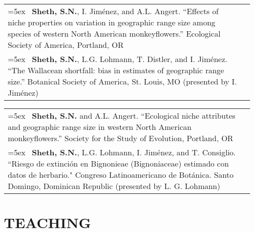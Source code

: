 \documentclass[11pt,english]{article}
\providecommand{\tabularnewline}{\\}
\begin{document}
\begin{tabularx}{\textwidth}{@{}>{\raggedright}p{5.25in} >{\raggedleft}X@{}}


\hangindent=5ex \ \textbf{Sheth, S.N.}, I. Jim\'enez, and A.L. Angert. ``Effects of niche properties on variation in geographic range size among species of western North American monkeyflowers.'' Ecological Society of America, Portland, OR & 2012 \tabularnewline

\hangindent=5ex \ \textbf{Sheth, S.N.}, L.G. Lohmann, T. Distler, and I. Jim\'enez. ``The Wallacean shortfall: bias in estimates of geographic range size.'' Botanical Society of America, St. Louis, MO (presented by I. Jim\'enez) & 2011 \tabularnewline

\end{tabularx}

\renewcommand{\arraystretch}{1.2}
\begin{tabularx}{\textwidth}{@{}>{\raggedright}p{5.25in} >{\raggedleft}X@{}}

\hangindent=5ex \ \textbf{Sheth, S.N.} and A.L. Angert. ``Ecological niche attributes and geographic range size in western North American monkeyflowers.'' Society for the Study of Evolution, Portland, OR & 2010 \tabularnewline

\hangindent=5ex \ \textbf{Sheth, S.N.}, L.G. Lohmann, I. Jim\'enez, and T. Consiglio. ``Riesgo de extinci\'on en Bignonieae (Bignoniaceae) estimado con datos de herbario." Congreso Latinoamericano de Bot\'anica. Santo Domingo, Dominican Republic (presented by L. G. Lohmann) & 2006 \tabularnewline 

\end{tabularx}

\section*{TEACHING}
\end{document}
